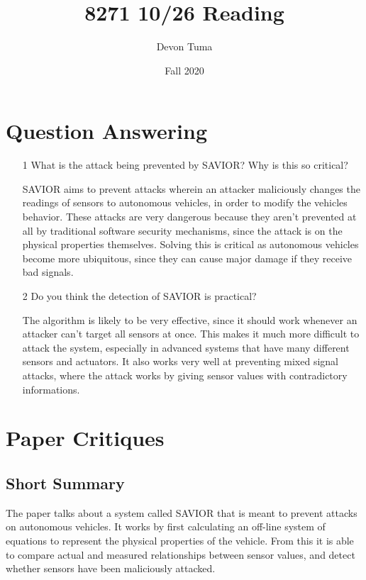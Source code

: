 \documentclass[11pt]{article}
\title{8271 10/26 Reading}
\author{Devon Tuma}
\date{Fall 2020}
\begin{document}
\maketitle

\section*{Question Answering}

\begin{itemize}
\item [1] What is the attack being prevented by SAVIOR? Why is this so critical?

  SAVIOR aims to prevent attacks wherein an attacker maliciously changes the readings of sensors to autonomous vehicles, in order to modify the vehicles behavior.
  These attacks are very dangerous because they aren't prevented at all by traditional software security mechanisms, since the attack is on the physical properties themselves.
  Solving this is critical as autonomous vehicles become more ubiquitous, since they can cause major damage if they receive bad signals.
  
\item [2] Do you think the detection of SAVIOR is practical?

  The algorithm is likely to be very effective, since it should work whenever an attacker can't target all sensors at once.
  This makes it much more difficult to attack the system, especially in advanced systems that have many different sensors and actuators.
  It also works very well at preventing mixed signal attacks, where the attack works by giving sensor values with contradictory informations.
  
\end{itemize}

\section*{Paper Critiques}

\subsection*{Short Summary}

The paper talks about a system called SAVIOR that is meant to prevent attacks on autonomous vehicles.
It works by first calculating an off-line system of equations to represent the physical properties of the vehicle.
From this it is able to compare actual and measured relationships between sensor values, and detect whether sensors have been maliciously attacked.
\end{document}
